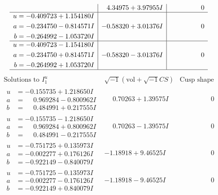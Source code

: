 \documentclass[1p]{elsarticle_modified}
\theoremstyle{definition}
\newcommand{\I}{\sqrt{-1}}
\begin{document}
$$\begin{array}{c|c|c}
 & \phantom{-}4.34975 + 3.97955 I & \phantom{-0.000000 } 0 \\ \hline\begin{aligned}
u &= -0.409723 + 1.154180 I \\
a &= -0.234750 - 0.814571 I \\
b &= -0.264992 - 1.053720 I\end{aligned}
 & -0.58320 + 3.01376 I & \phantom{-0.000000 } 0 \\ \hline\begin{aligned}
u &= -0.409723 - 1.154180 I \\
a &= -0.234750 + 0.814571 I \\
b &= -0.264992 + 1.053720 I\end{aligned}
 & -0.58320 - 3.01376 I & \phantom{-0.000000 } 0\\
 \hline 
 \end{array}$$\newpage$$\begin{array}{c|c|c}  
\text{Solutions to }I^u_{1}& \I (\text{vol} + \sqrt{-1}CS) & \text{Cusp shape}\\
 \hline 
\begin{aligned}
u &= -0.155735 + 1.218650 I \\
a &= \phantom{-}0.969284 - 0.800962 I \\
b &= \phantom{-}0.484991 + 0.217555 I\end{aligned}
 & \phantom{-}0.70263 + 1.39575 I & \phantom{-0.000000 } 0 \\ \hline\begin{aligned}
u &= -0.155735 - 1.218650 I \\
a &= \phantom{-}0.969284 + 0.800962 I \\
b &= \phantom{-}0.484991 - 0.217555 I\end{aligned}
 & \phantom{-}0.70263 - 1.39575 I & \phantom{-0.000000 } 0 \\ \hline\begin{aligned}
u &= -0.751725 + 0.135973 I \\
a &= -0.002277 + 0.176126 I \\
b &= -0.922149 - 0.840079 I\end{aligned}
 & -1.18918 + 9.46525 I & \phantom{-0.000000 } 0 \\ \hline\begin{aligned}
u &= -0.751725 - 0.135973 I \\
a &= -0.002277 - 0.176126 I \\
b &= -0.922149 + 0.840079 I\end{aligned}
 & -1.18918 - 9.46525 I & \phantom{-0.000000 } 0 \\ \hline\begin{aligned}

\end{aligned}
\end{array}$$
\end{document}
